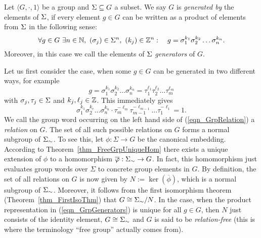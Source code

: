 
\begin{definition}
Let $\langle G, \cdot, 1 \rangle$ be a group and $\Sigma \subseteq G$ a subset. We say $G$ is \emph{generated by} the elements of $\Sigma$, if every element $g \in G$ can be written as a product of elements from $\Sigma$ in the following sense:
\begin{equation}
\label{eqn_GrpGenerators}
\forall g \in G\ \exists n \in \mathbb{N},\ (\sigma_j) \in \Sigma^n,\ (k_j) \in \mathbb{Z}^n:\quad 
g = \sigma_1^{k_1} \sigma_2^{k_2} \dots \sigma_n^{k_n}.
\end{equation}
Moreover, in this case we call the elements of $\Sigma$ \emph{generators} of $G$. 
\end{definition}

Let us first consider the case, when some $g \in G$ can be generated in two  different ways, for example
\begin{equation*}
g = \sigma_1^{k_1} \sigma_2^{k_2} \dots \sigma_n^{k_n} 
  = \tau_1^{\ell_1} \tau_2^{\ell_2} \dots \tau_m^{\ell_m}
\end{equation*}
with $\sigma_j, \tau_j \in \Sigma$ and $k_j, \ell_j \in \mathbb{Z}$. This immediately gives
\begin{equation}
\label{eqn_GrpRelation}
\sigma_1^{k_1} \sigma_2^{k_e} \dots \sigma_n^{k_n} \cdot
\tau_m^{-\ell_m} \tau_{m-1}^{-\ell_{m-1}} \dots \tau_1^{-\ell_1} = 1.
\end{equation}
We call the group word occurring on the left hand side of (\ref{eqn_GrpRelation}) a \emph{relation} on $G$. The set of all such possible relations on $G$ forms a normal subgroup of ${\Sigma}_{\sim}$. To see this, let $\phi : \Sigma \to G$ be the canonical embedding. According to Theorem~\ref{thm_FreeGrpUniqueHom} there exists a unique extension of $\phi$ to a homomorphism $\overline{\varphi}: {\Sigma}_{\sim} \to G$. In fact, this homomorphism just evaluates group words over $\Sigma$ to concrete group elements in $G$. By definition, the set of all relations on $G$ is now given by $N := \ker(\overline{\phi})$, which is a normal subgroup of ${\Sigma}_{\sim}$. Moreover, it follows from the first isomorphism theorem (Theorem~\ref{thm_FirstIsoThm}) that $G \cong {\Sigma}_{\sim} / N$. In the case, when the product representation in (\ref{eqn_GrpGenerators}) is unique for all $g \in G$, then $N$ just consists of the identity element, $G \cong {\Sigma}_{\sim}$ and $G$ is said to be \emph{relation-free} (this is where the terminology ``free group'' actually comes from). 

